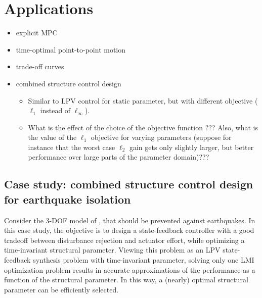 \documentclass{article}
\begin{document}
\section{Applications}

\begin{itemize}
\item explicit MPC
\item time-optimal point-to-point motion
\item trade-off curves
\item combined structure control design
    \begin{itemize}
    \item Similar to LPV control for static parameter, but with different objective ($\ell_1$ instead of $\ell_\infty$).
    \item What is the effect of the choice of the objective function ??? Also, what is the value of the $\ell_1$ objective for varying parameters (suppose for instance that the worst case $\ell_2$ gain gets only slightly larger, but better performance over large parts of the parameter domain)???
    \end{itemize}
\end{itemize}

\subsection{Case study: combined structure control design for earthquake isolation}
Consider the 3-DOF model of \cite{Camino_2003}, that should be prevented against earthquakes. In this case study, the objective is to design a state-feedback controller with a good tradeoff between disturbance rejection and actuator effort, while optimizing a time-invariant structural parameter. Viewing this problem as an LPV state-feedback synthesis problem with time-invariant parameter, solving only one LMI optimization problem results in accurate approximations of the performance as a function of the structural parameter. In this way, a (nearly) optimal structural parameter can be efficiently selected.
\end{document}
